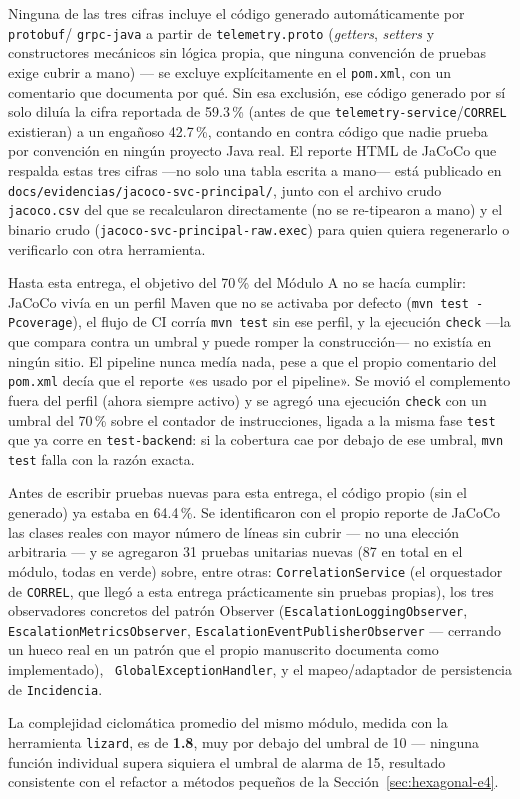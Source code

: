 Ninguna de las tres cifras incluye el código generado automáticamente por \texttt{protobuf}/
\texttt{grpc-java} a partir de \texttt{telemetry.proto} (\emph{getters}, \emph{setters} y
constructores mecánicos sin lógica propia, que ninguna convención de pruebas exige cubrir a
mano) — se excluye explícitamente en el \texttt{pom.xml}, con un comentario que documenta por
qué. Sin esa exclusión, ese código generado por sí solo diluía la cifra reportada de 59.3\,\%
(antes de que \texttt{telemetry-service}/\texttt{CORREL} existieran) a un engañoso 42.7\,\%,
contando en contra código que nadie prueba por convención en ningún proyecto Java real. El
reporte HTML de JaCoCo que respalda estas tres cifras —no solo una tabla escrita a mano— está
publicado en \texttt{docs/evidencias/jacoco-svc-principal/}, junto con el archivo crudo
\texttt{jacoco.csv} del que se recalcularon directamente (no se re-tipearon a mano) y el binario
crudo (\texttt{jacoco-svc-principal-raw.exec}) para quien quiera regenerarlo o verificarlo con
otra herramienta.

Hasta esta entrega, el objetivo del 70\,\% del Módulo A no se hacía cumplir: JaCoCo vivía en un
perfil Maven que no se activaba por defecto (\texttt{mvn test -Pcoverage}), el flujo de CI corría
\texttt{mvn test} sin ese perfil, y la ejecución \texttt{check} —la que compara contra un
umbral y puede romper la construcción— no existía en ningún sitio. El pipeline nunca medía nada,
pese a que el propio comentario del \texttt{pom.xml} decía que el reporte «es usado por el
pipeline». Se movió el complemento fuera del perfil (ahora siempre activo) y se agregó una
ejecución \texttt{check} con un umbral del 70\,\% sobre el contador de instrucciones, ligada a la
misma fase \texttt{test} que ya corre en \texttt{test-backend}: si la cobertura cae por debajo de
ese umbral, \texttt{mvn test} falla con la razón exacta.

Antes de escribir pruebas nuevas para esta entrega, el código propio (sin el generado) ya estaba
en 64.4\,\%. Se identificaron con el propio reporte de JaCoCo las clases reales con mayor número
de líneas sin cubrir — no una elección arbitraria — y se agregaron 31 pruebas unitarias nuevas
(87 en total en el módulo, todas en verde) sobre, entre otras: \texttt{CorrelationService} (el
orquestador de \texttt{CORREL}, que llegó a esta entrega prácticamente sin pruebas propias), los
tres observadores concretos del patrón Observer (\texttt{EscalationLoggingObserver},
\texttt{EscalationMetricsObserver}, \texttt{EscalationEventPublisherObserver} — cerrando un hueco
real en un patrón que el propio manuscrito documenta como implementado), \texttt{
GlobalExceptionHandler}, y el mapeo/adaptador de persistencia de \texttt{Incidencia}.

La complejidad ciclomática promedio del mismo módulo, medida con la herramienta \texttt{lizard},
es de \textbf{1.8}, muy por debajo del umbral de 10 — ninguna función individual supera siquiera
el umbral de alarma de 15, resultado consistente con el refactor a métodos pequeños de la
Sección~\ref{sec:hexagonal-e4}.
